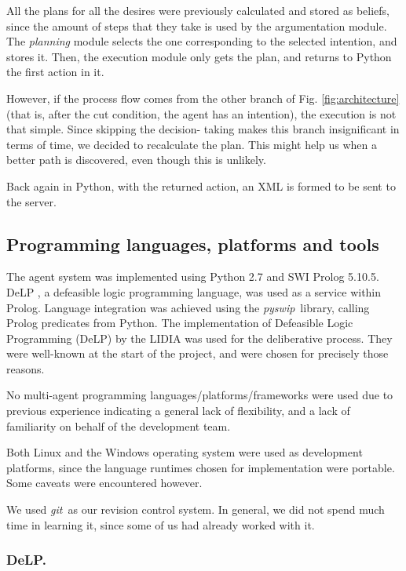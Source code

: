 \documentclass{llncs2e/llncs}
\begin{document}
    All the plans for all the desires were previously calculated and stored as 
    beliefs, since the amount of steps that they take is used by the 
    argumentation module. The \textit{planning} module selects the one 
    corresponding to the selected intention, and stores it. Then, the 
    execution module only gets the plan, and returns to Python the first 
    action in it.

    However, if the process flow comes from the other branch of Fig. 
    \ref{fig:architecture} (that is, after the cut condition, the agent has an 
    intention), the execution is not that simple. Since skipping the decision-
    taking makes this branch insignificant in terms of time, we decided to 
    recalculate the plan. This might help us when a better path is discovered, 
    even though this is unlikely.

    Back again in Python, with the returned action, an XML is formed to be sent 
    to the server.

\subsection{Programming languages, platforms and tools}

    The agent system was implemented using Python 2.7 and SWI Prolog 5.10.5. DeLP 
    \cite{Garcia:2004a}, a defeasible logic programming language, was used as a 
    service within Prolog. 
    Language integration was achieved using the \textit{pyswip}\ library, 
    calling Prolog predicates from Python. The implementation of Defeasible 
    Logic Programming (DeLP) by the LIDIA was used for the deliberative 
    process. They were well-known at the start of the project, and were chosen 
    for precisely those reasons.
    
    No multi-agent programming languages/platforms/frameworks were used due to 
    previous experience indicating a general lack of flexibility, and a lack of 
    familiarity on behalf of the development team.
    
    Both Linux and the Windows operating system were used as development 
    platforms, since the language runtimes chosen for implementation were 
    portable. Some caveats were encountered however.

    We used \textit{git}\ as our revision control system. In general, we did 
    not spend much time in learning it, since some of us had already worked 
    with it.

\subsubsection{DeLP.}
    
\end{document}
